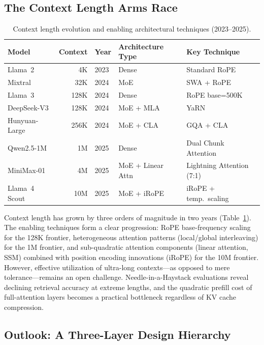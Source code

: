 \subsection{The Context Length Arms Race}
\label{subsec:context_race}

\begin{table}[t]
\centering
\caption{Context length evolution and enabling architectural techniques (2023--2025).}
\label{tab:context_length}
\small
\begin{tabular}{lrlll}
\hline
\textbf{Model} & \textbf{Context} & \textbf{Year} & \textbf{Architecture Type} & \textbf{Key Technique} \\
\hline
Llama~2 & 4K & 2023 & Dense & Standard RoPE \\
Mixtral & 32K & 2024 & MoE & SWA + RoPE \\
Llama~3 & 128K & 2024 & Dense & RoPE base=500K \\
DeepSeek-V3 & 128K & 2024 & MoE + MLA & YaRN \\
Hunyuan-Large & 256K & 2024 & MoE + CLA & GQA + CLA \\
Qwen2.5-1M & 1M & 2025 & Dense & Dual Chunk Attention \\
MiniMax-01 & 4M & 2025 & MoE + Linear Attn & Lightning Attention (7:1) \\
Llama~4 Scout & 10M & 2025 & MoE + iRoPE & iRoPE + temp.\ scaling \\
\hline
\end{tabular}
\end{table}

Context length has grown by three orders of magnitude in two years (Table~\ref{tab:context_length}). The enabling techniques form a clear progression: RoPE base-frequency scaling for the 128K frontier, heterogeneous attention patterns (local/global interleaving) for the 1M frontier, and sub-quadratic attention components (linear attention, SSM) combined with position encoding innovations (iRoPE) for the 10M frontier. However, effective utilization of ultra-long contexts---as opposed to mere tolerance---remains an open challenge. Needle-in-a-Haystack evaluations reveal declining retrieval accuracy at extreme lengths, and the quadratic prefill cost of full-attention layers becomes a practical bottleneck regardless of KV cache compression.

\subsection{Outlook: A Three-Layer Design Hierarchy}
\label{subsec:industry_outlook}

